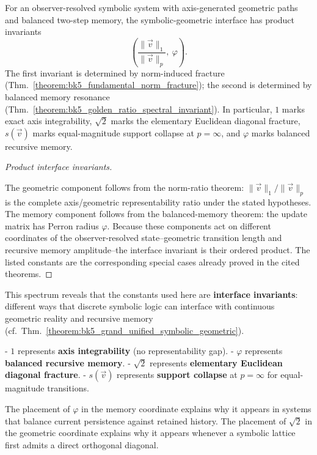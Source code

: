 \begin{theorem}
\label{theorem:bk5_grand_unified_symbolic_geometric}
For an observer-resolved symbolic system with axis-generated geometric paths and
balanced two-step memory, the symbolic-geometric interface has product
invariants
\[
\left(\frac{\|\vec{v}\|_1}{\|\vec{v}\|_p},\ \varphi\right).
\]
The first invariant is determined by norm-induced fracture
(Thm.~\ref{theorem:bk5_fundamental_norm_fracture}); the second is determined by
balanced memory resonance
(Thm.~\ref{theorem:bk5_golden_ratio_spectral_invariant}).  In particular,
$1$ marks exact axis integrability, $\sqrt{2}$ marks the elementary Euclidean
diagonal fracture, $s(\vec{v})$ marks equal-magnitude support collapse at
$p=\infty$, and $\varphi$ marks balanced recursive memory.
\end{theorem}

\begin{proof}[Product interface invariants]
\label{proof:bk5_grand_unified_symbolic_geometric}
\leavevmode

The geometric component follows from the norm-ratio theorem:
$\|\vec{v}\|_1/\|\vec{v}\|_p$ is the complete axis/geometric representability
ratio under the stated hypotheses.  The memory component follows from the
balanced-memory theorem: the update matrix has Perron radius $\varphi$.
Because these components act on different coordinates of the observer-resolved
state--geometric transition length and recursive memory amplitude--the interface
invariant is their ordered product.  The listed constants are the corresponding
special cases already proved in the cited theorems.
\end{proof}

\begin{demonstratio}
\label{demonstratio:bk5_deep_unity_math_meaning}
This spectrum reveals that the constants used here are \textbf{interface
invariants}: different ways that discrete symbolic logic can interface with
continuous geometric reality and recursive memory
(cf.~Thm.~\ref{theorem:bk5_grand_unified_symbolic_geometric}).

- \textbf{$1$} represents \textbf{axis integrability} (no representability gap).
- \textbf{$\varphi$} represents \textbf{balanced recursive memory}.
- \textbf{$\sqrt{2}$} represents \textbf{elementary Euclidean diagonal fracture}.
- \textbf{$s(\vec{v})$} represents \textbf{support collapse} at $p=\infty$ for equal-magnitude transitions.

The placement of $\varphi$ in the memory coordinate explains why it appears in
systems that balance current persistence against retained history.  The
placement of $\sqrt{2}$ in the geometric coordinate explains why it appears
whenever a symbolic lattice first admits a direct orthogonal diagonal.
\end{demonstratio}

